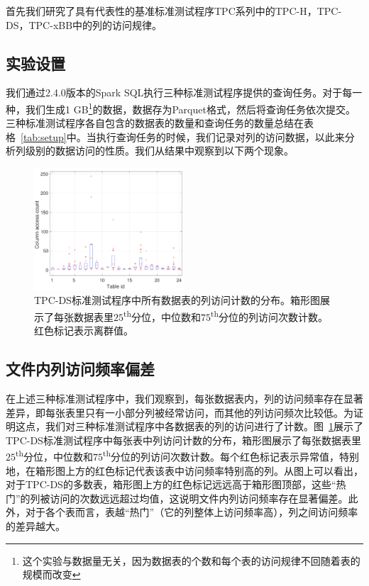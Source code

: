 \par 首先我们研究了具有代表性的基准标准测试程序TPC系列中的TPC-H，TPC-DS，TPC-xBB中的列的访问规律。

\subsection{实验设置}

\par 我们通过2.4.0版本的Spark SQL执行三种标准测试程序提供的查询任务。对于每一种，我们生成1 GB\footnote{这个实验与数据量无关，因为数据表的个数和每个表的访问规律不回随着表的规模而改变}的数据，数据存为Parquet格式，然后将查询任务依次提交。三种标准测试程序各自包含的数据表的数量和查询任务的数量总结在表格~\ref{tab:setup}中。当执行查询任务的时候，我们记录对列的访问数据，以此来分析列级别的数据访问的性质。我们从结果中观察到以下两个现象。

\begin{figure}[t]
	\centering
	\includegraphics[width=0.5\textwidth]{img/motivation/column-pop}
	\caption{TPC-DS标准测试程序中所有数据表的列访问计数的分布。箱形图展示了每张数据表里$25$\textsuperscript{th}分位，中位数和$75$\textsuperscript{th}分位的列访问次数计数。红色标记表示离群值。}
	\label{fig:tpc-ds-column-pop}
\end{figure}

\subsection{文件内列访问频率偏差}

\par 在上述三种标准测试程序中，我们观察到，每张数据表内，列的访问频率存在显著差异，即每张表里只有一小部分列被经常访问，而其他的列访问频次比较低。为证明这点，我们对三种标准测试程序中各数据表的列的访问进行了计数。图~\ref{fig:tpc-ds-column-pop}展示了TPC-DS标准测试程序中每张表中列访问计数的分布，箱形图展示了每张数据表里$25$\textsuperscript{th}分位，中位数和$75$\textsuperscript{th}分位的列访问次数计数。每个红色标记表示异常值，特别地，在箱形图上方的红色标记代表该表中访问频率特别高的列。从图上可以看出，对于TPC-DS的多数表，箱形图上方的红色标记远远高于箱形图顶部，这些“热门”的列被访问的次数远远超过均值，这说明文件内列访问频率存在显著偏差。此外，对于各个表而言，表越“热门”（它的列整体上访问频率高），列之间访问频率的差异越大。

